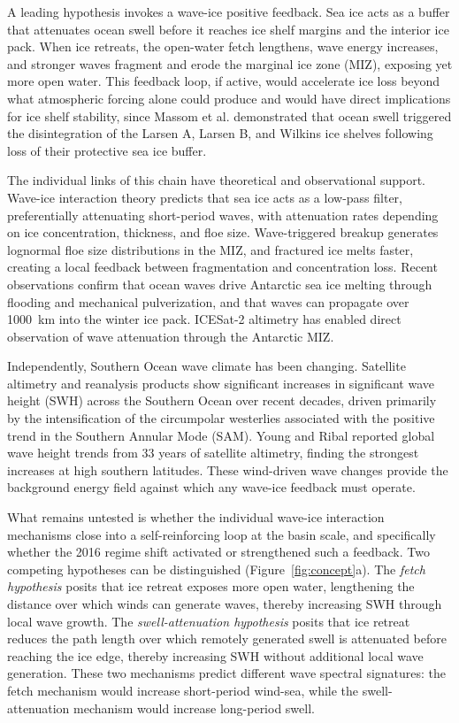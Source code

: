 \documentclass[11pt]{article}
\begin{document}
A leading hypothesis invokes a wave-ice positive feedback. Sea ice acts as a buffer that attenuates ocean swell before it reaches ice shelf margins and the interior ice pack\cite{Massom2018,Squire2020}. When ice retreats, the open-water fetch lengthens, wave energy increases, and stronger waves fragment and erode the marginal ice zone (MIZ), exposing yet more open water. This feedback loop, if active, would accelerate ice loss beyond what atmospheric forcing alone could produce and would have direct implications for ice shelf stability, since Massom et al.\cite{Massom2018} demonstrated that ocean swell triggered the disintegration of the Larsen A, Larsen B, and Wilkins ice shelves following loss of their protective sea ice buffer.

The individual links of this chain have theoretical and observational support. Wave-ice interaction theory predicts that sea ice acts as a low-pass filter, preferentially attenuating short-period waves, with attenuation rates depending on ice concentration, thickness, and floe size\cite{Squire2020,Bennetts2022,Meylan2018}. Wave-triggered breakup generates lognormal floe size distributions in the MIZ\cite{Mokus2022}, and fractured ice melts faster, creating a local feedback between fragmentation and concentration loss. Recent observations confirm that ocean waves drive Antarctic sea ice melting through flooding and mechanical pulverization\cite{Kohout2026}, and that waves can propagate over 1000~km into the winter ice pack\cite{Kohout2014}. ICESat-2 altimetry has enabled direct observation of wave attenuation through the Antarctic MIZ\cite{Womack2022}.

Independently, Southern Ocean wave climate has been changing. Satellite altimetry and reanalysis products show significant increases in significant wave height (SWH) across the Southern Ocean over recent decades, driven primarily by the intensification of the circumpolar westerlies associated with the positive trend in the Southern Annular Mode (SAM)\cite{Marshall2003}. Young and Ribal\cite{Young2019} reported global wave height trends from 33 years of satellite altimetry, finding the strongest increases at high southern latitudes. These wind-driven wave changes provide the background energy field against which any wave-ice feedback must operate.

What remains untested is whether the individual wave-ice interaction mechanisms close into a self-reinforcing loop at the basin scale, and specifically whether the 2016 regime shift activated or strengthened such a feedback. Two competing hypotheses can be distinguished (Figure~\ref{fig:concept}a). The \textit{fetch hypothesis} posits that ice retreat exposes more open water, lengthening the distance over which winds can generate waves, thereby increasing SWH through local wave growth. The \textit{swell-attenuation hypothesis} posits that ice retreat reduces the path length over which remotely generated swell is attenuated before reaching the ice edge, thereby increasing SWH without additional local wave generation. These two mechanisms predict different wave spectral signatures: the fetch mechanism would increase short-period wind-sea, while the swell-attenuation mechanism would increase long-period swell.
\end{document}
